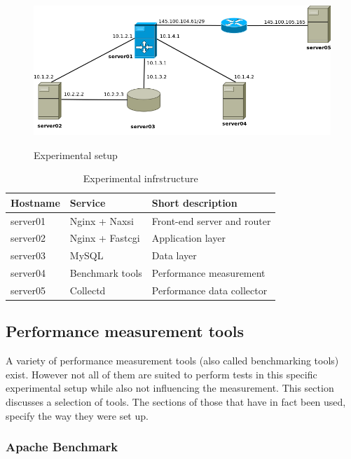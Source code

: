 \documentclass[Methods]{subfiles}
\begin{document}
\begin{figure}[h]
\caption{Experimental setup}
\centering
\includegraphics[scale=0.4] {images/infrastructure.png}
\label{fig:Experimental setup}
\end{figure}

\begin{table}[h]
\caption{Experimental infrstructure}
\begin{tabular}{|p{}|p{}|p{5cm}|}
\hline
\textbf{Hostname} & \textbf{Service} & \textbf{Short description} \\ \hline
server01 & Nginx + Naxsi & Front-end server and router \\ \hline
server02 & Nginx + Fastcgi & Application layer \\ \hline
server03 & MySQL & Data layer \\ \hline
server04 & Benchmark tools & Performance measurement \\ \hline
server05 & Collectd & Performance data collector \\ \hline
\end{tabular}
\label{tab:Experimental infrastructure}
\end{table}

\subsection{Performance measurement tools}
A variety of performance measurement tools (also called benchmarking tools) exist. However not all of them are suited to perform tests in this specific experimental setup while also not influencing the measurement. This section discusses a selection of tools. The sections of those that have in fact been used, specify the way they were set up.

\subsubsection{Apache Benchmark}

\end{document}
